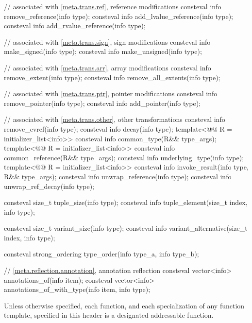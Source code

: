 \begin{codeblock}
{  // associated with \ref{meta.trans.ref}, reference modifications
  consteval info remove_reference(info type);
  consteval info add_lvalue_reference(info type);
  consteval info add_rvalue_reference(info type);

  // associated with \ref{meta.trans.sign}, sign modifications
  consteval info make_signed(info type);
  consteval info make_unsigned(info type);

  // associated with \ref{meta.trans.arr}, array modifications
  consteval info remove_extent(info type);
  consteval info remove_all_extents(info type);

  // associated with \ref{meta.trans.ptr}, pointer modifications
  consteval info remove_pointer(info type);
  consteval info add_pointer(info type);

  // associated with \ref{meta.trans.other}, other transformations
  consteval info remove_cvref(info type);
  consteval info decay(info type);
  template<@@ R = initializer_list<info>>
    consteval info common_type(R&& type_args);
  template<@@ R = initializer_list<info>>
    consteval info common_reference(R&& type_args);
  consteval info underlying_type(info type);
  template<@@ R = initializer_list<info>>
    consteval info invoke_result(info type, R&& type_args);
  consteval info unwrap_reference(info type);
  consteval info unwrap_ref_decay(info type);

  consteval size_t tuple_size(info type);
  consteval info tuple_element(size_t index, info type);

  consteval size_t variant_size(info type);
  consteval info variant_alternative(size_t index, info type);

  consteval strong_ordering type_order(info type_a, info type_b);

  // \ref{meta.reflection.annotation}, annotation reflection
  consteval vector<info> annotations_of(info item);
  consteval vector<info> annotations_of_with_type(info item, info type);
}
\end{codeblock}

\pnum
Unless otherwise specified,
each function, and each specialization of any function template,
specified in this header
is a designated addressable function.

